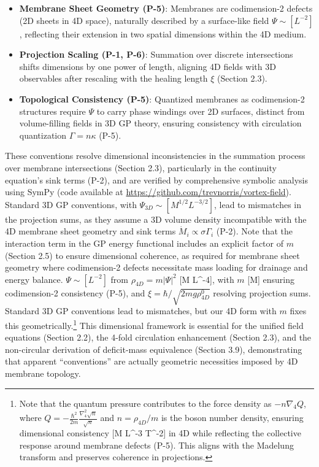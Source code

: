 \begin{itemize}
    \item \textbf{Membrane Sheet Geometry (P-5)}: Membranes are codimension-2 defects (2D sheets in 4D space), naturally described by a surface-like field $\Psi \sim [L^{-2}]$, reflecting their extension in two spatial dimensions within the 4D medium.
    \item \textbf{Projection Scaling (P-1, P-6)}: Summation over discrete intersections shifts dimensions by one power of length, aligning 4D fields with 3D observables after rescaling with the healing length $\xi$ (Section 2.3).
    \item \textbf{Topological Consistency (P-5)}: Quantized membranes as codimension-2 structures require $\Psi$ to carry phase windings over 2D surfaces, distinct from volume-filling fields in 3D GP theory, ensuring consistency with circulation quantization $\Gamma = n \kappa$ (P-5).
\end{itemize}

These conventions resolve dimensional inconsistencies in the summation process over membrane intersections (Section 2.3), particularly in the continuity equation's sink terms (P-2), and are verified by comprehensive symbolic analysis using SymPy (code available at \url{https://github.com/trevnorris/vortex-field}). Standard 3D GP conventions, with $\Psi_{3D} \sim [M^{1/2} L^{-3/2}]$, lead to mismatches in the projection sums, as they assume a 3D volume density incompatible with the 4D membrane sheet geometry and sink terms $\dot{M}_i \propto \sigma \Gamma_i$ (P-2). Note that the interaction term in the GP energy functional includes an explicit factor of $m$ (Section 2.5) to ensure dimensional coherence, as required for membrane sheet geometry where codimension-2 defects necessitate mass loading for drainage and energy balance. $\Psi \sim [L^{-2}]$ from $\rho_{4D} = m |\Psi|^2$ [M L^{-4}], with $m$ [M] ensuring codimension-2 consistency (P-5), and $\xi = \hbar / \sqrt{2 m g \rho_{4D}^0}$ resolving projection sums. Standard 3D GP conventions lead to mismatches, but our 4D form with $m$ fixes this geometrically.\footnote{Note that the quantum pressure contributes to the force density as $-n \nabla_4 Q$, where $Q = -\frac{\hbar^2}{2m} \frac{\nabla_4^2 \sqrt{n}}{\sqrt{n}}$ and $n = \rho_{4D}/m$ is the boson number density, ensuring dimensional consistency [M L^{-3} T^{-2}] in 4D while reflecting the collective response around membrane defects (P-5). This aligns with the Madelung transform and preserves coherence in projections.} This dimensional framework is essential for the unified field equations (Section 2.2), the 4-fold circulation enhancement (Section 2.3), and the non-circular derivation of deficit-mass equivalence (Section 3.9), demonstrating that apparent ``conventions'' are actually geometric necessities imposed by 4D membrane topology.


